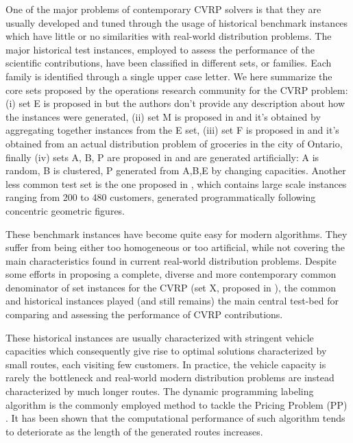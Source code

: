 One of the major problems of contemporary CVRP solvers
is that they are usually developed and tuned through the usage
of historical benchmark instances which
have little or no similarities with real-world distribution problems.
The major historical test instances,
employed to assess the performance of the scientific contributions,
have been classified in different sets, or families.
Each family is identified through a single upper case letter.
We here summarize the core sets proposed by the operations research community for the CVRP problem:
(i) set E is proposed in \textcite{christofides1969} but the authors don't provide any
description about how the instances were generated,
(ii) set M is proposed in \textcite{christofides1979} and
it's obtained by aggregating together instances from the E set,
(iii) set F is proposed in \textcite{fisher1994} and it's obtained from an actual distribution problem of groceries in the city of Ontario,
finally (iv) sets A, B, P are proposed in \textcite{augerat1995} and are generated artificially: A is random, B is clustered, P generated from A,B,E by changing capacities.
Another less common test set is the one proposed in \textcite{golden1998},
which contains large scale instances ranging from 200 to 480 customers,
generated programmatically following concentric geometric figures.

These benchmark instances have become quite easy for modern algorithms.
They suffer from being either too homogeneous or too artificial,
while not covering the main characteristics found in current real-world distribution problems.
Despite some efforts in proposing a complete, diverse and more contemporary common denominator
of set instances for the CVRP (set X, proposed in \textcite{uchoa2017}),
the common and historical instances played (and still remains) the main central test-bed for comparing
and assessing the performance of CVRP contributions.

These historical instances are usually characterized with stringent vehicle capacities
which consequently give rise to optimal solutions characterized by small routes, each visiting few customers.
In practice, the vehicle capacity is rarely the bottleneck and
real-world modern distribution problems are instead characterized by much longer routes.
The dynamic programming labeling algorithm
\parencite{desrochers1992,feillet2004}
is the commonly employed method to tackle the Pricing Problem (PP) \parencite{gutierrez-jarpa2010, archetti2011, bettinelli2011, contardo2014, contardo2015, pecin2017b, pecin2017, pessoa2020a}.
It has been shown that the computational performance of such algorithm
tends to deteriorate as the length of the generated routes increases.

